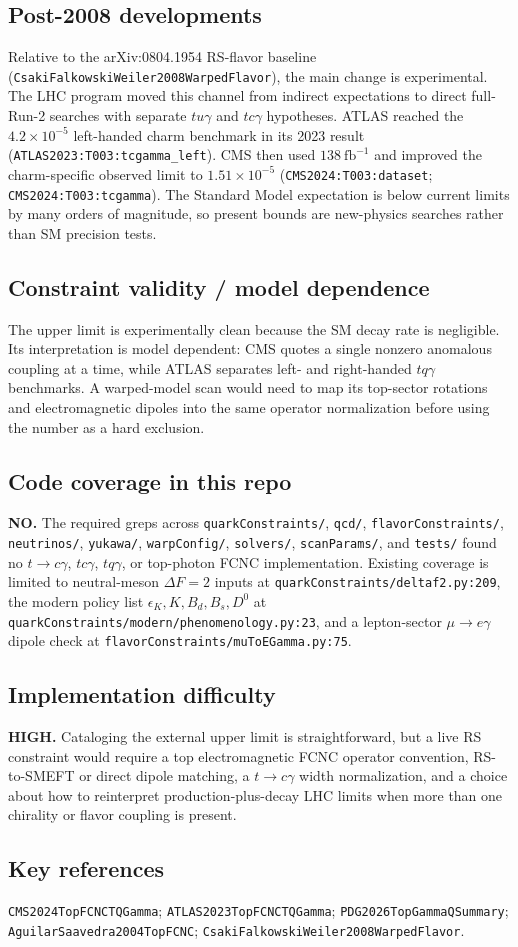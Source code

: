 \subsection*{Post-2008 developments}
Relative to the arXiv:0804.1954 RS-flavor baseline
(\texttt{CsakiFalkowskiWeiler2008WarpedFlavor}), the main change is
experimental.  The LHC program moved this channel from indirect expectations to
direct full-Run-2 searches with separate \(tu\gamma\) and \(tc\gamma\)
hypotheses.  ATLAS reached the \(4.2\times10^{-5}\) left-handed charm benchmark
in its 2023 result (\texttt{ATLAS2023:T003:tcgamma\_left}).  CMS then used
\(138~\mathrm{fb}^{-1}\) and improved the charm-specific observed limit to
\(1.51\times10^{-5}\) (\texttt{CMS2024:T003:dataset};
\texttt{CMS2024:T003:tcgamma}).  The Standard Model expectation is below
current limits by many orders of magnitude, so present bounds are new-physics
searches rather than SM precision tests.

\subsection*{Constraint validity / model dependence}
The upper limit is experimentally clean because the SM decay rate is
negligible.  Its interpretation is model dependent: CMS quotes a single
nonzero anomalous coupling at a time, while ATLAS separates left- and
right-handed \(tq\gamma\) benchmarks.  A warped-model scan would need to map
its top-sector rotations and electromagnetic dipoles into the same operator
normalization before using the number as a hard exclusion.

\subsection*{Code coverage in this repo}
\textbf{NO.}  The required greps across \texttt{quarkConstraints/},
\texttt{qcd/}, \texttt{flavorConstraints/}, \texttt{neutrinos/},
\texttt{yukawa/}, \texttt{warpConfig/}, \texttt{solvers/},
\texttt{scanParams/}, and \texttt{tests/} found no \(t\to c\gamma\),
\(tc\gamma\), \(tq\gamma\), or top-photon FCNC implementation.  Existing
coverage is limited to neutral-meson \(\Delta F=2\) inputs at
\texttt{quarkConstraints/deltaf2.py:209}, the modern policy list
\(\epsilon_K,K,B_d,B_s,D^0\) at
\texttt{quarkConstraints/modern/phenomenology.py:23}, and a lepton-sector
\(\mu\to e\gamma\) dipole check at \texttt{flavorConstraints/muToEGamma.py:75}.

\subsection*{Implementation difficulty}
\textbf{HIGH.}  Cataloging the external upper limit is straightforward, but a
live RS constraint would require a top electromagnetic FCNC operator
convention, RS-to-SMEFT or direct dipole matching, a \(t\to c\gamma\) width
normalization, and a choice about how to reinterpret production-plus-decay LHC
limits when more than one chirality or flavor coupling is present.

\subsection*{Key references}
\texttt{CMS2024TopFCNCTQGamma}; \texttt{ATLAS2023TopFCNCTQGamma};
\texttt{PDG2026TopGammaQSummary}; \texttt{AguilarSaavedra2004TopFCNC};
\texttt{CsakiFalkowskiWeiler2008WarpedFlavor}.

